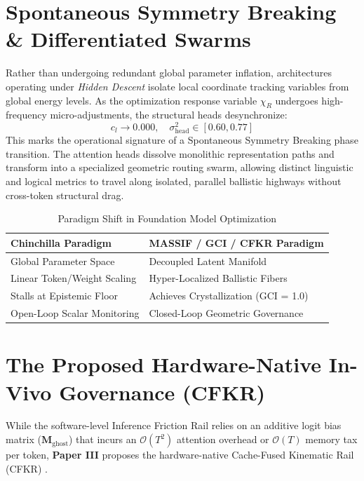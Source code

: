 \documentclass[11pt]{article}
\begin{document}
\section{Spontaneous Symmetry Breaking \& Differentiated Swarms}
Rather than undergoing redundant global parameter inflation, architectures operating under \textit{Hidden Descent} isolate local coordinate tracking variables from global energy levels. As the optimization response variable $\chi_R$ undergoes high-frequency micro-adjustments, the structural heads desynchronize:
\begin{equation}
c_l \to 0.000, \quad \sigma^2_{\text{head}} \in [0.60, 0.77]
\end{equation}
This marks the operational signature of a Spontaneous Symmetry Breaking phase transition. The attention heads dissolve monolithic representation paths and transform into a specialized geometric routing swarm, allowing distinct linguistic and logical metrics to travel along isolated, parallel ballistic highways without cross-token structural drag.

\begin{table}[h]
\centering
\caption{Paradigm Shift in Foundation Model Optimization}
\label{tab:paradigm}
\renewcommand{\arraystretch}{1.3}
\begin{tabular}{p{} p{}}
\toprule
\textbf{Chinchilla Paradigm} & \textbf{MASSIF / GCI / CFKR Paradigm} \\
\midrule
Global Parameter Space & Decoupled Latent Manifold \\
Linear Token/Weight Scaling & Hyper-Localized Ballistic Fibers \\
Stalls at Epistemic Floor & Achieves Crystallization (GCI = 1.0) \\
Open-Loop Scalar Monitoring & Closed-Loop Geometric Governance \\
\bottomrule
\end{tabular}
\end{table}

\section{The Proposed Hardware-Native In-Vivo Governance (CFKR)}
While the software-level Inference Friction Rail relies on an additive logit bias matrix ($\mathbf{M}_{\text{ghost}}$) that incurs an $\mathcal{O}(T^2)$ attention overhead or $\mathcal{O}(T)$ memory tax per token, \textbf{Paper III} proposes the hardware-native Cache-Fused Kinematic Rail (CFKR) \cite{cfkr2026}. 
\end{document}
